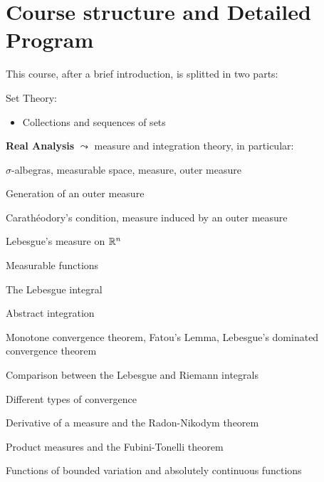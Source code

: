 
\setcounter{chapter}{-1}
\chapter{Course structure and Detailed Program}
\thispagestyle{empty}

This course, after a brief introduction, is splitted in two parts:
\begin{enumerate}{
	\item[0)] Set Theory:
	\begin{itemize}
		\item Collections and sequences of sets
	\end{itemize}

	\item[1)]  \textbf{Real Analysis} $\leadsto$ measure and integration theory, in particular:
	\begin{itemize}{
		\item $\sigma$-albegras, measurable space, measure, outer measure
		\item Generation of an outer measure
		\item Carathéodory's condition, measure induced by an outer measure
		\item Lebesgue's measure on $\mathbb{R}^n$
		\item Measurable functions
		\item The Lebesgue integral
		\item Abstract integration
		\item Monotone convergence theorem, Fatou's Lemma, Lebesgue's dominated convergence theorem
		\item Comparison between the Lebesgue and Riemann integrals
		\item Different types of convergence
		\item Derivative of a measure and the Radon-Nikodym theorem
		\item Product measures and the Fubini-Tonelli theorem
		\item Functions of bounded variation and absolutely continuous functions
	}
	\end{itemize}

}
\end{enumerate}
